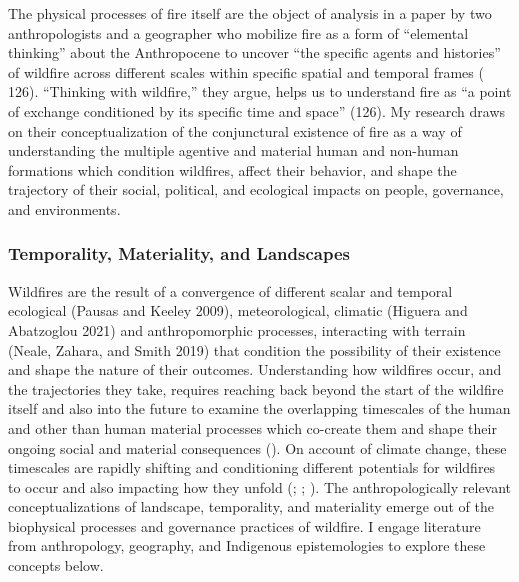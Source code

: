 \documentclass[
]{article}
\begin{document}
The physical processes of fire itself are the object of analysis in a paper by two anthropologists and a geographer who mobilize fire as a form of ``elemental thinking'' about the Anthropocene to uncover ``the specific agents and histories'' of wildfire across different scales within specific spatial and temporal frames ( 126). ``Thinking with wildfire,'' they argue, helps us to understand fire as ``a point of exchange conditioned by its specific time and space'' (126). My research draws on their conceptualization of the conjunctural existence of fire as a way of understanding the multiple agentive and material human and non-human formations which condition wildfires, affect their behavior, and shape the trajectory of their social, political, and ecological impacts on people, governance, and environments.

\subsubsection{Temporality, Materiality, and Landscapes}\label{temporality-materiality-and-landscapes}

Wildfires are the result of a convergence of different scalar and temporal ecological (Pausas and Keeley 2009), meteorological, climatic (Higuera and Abatzoglou 2021) and anthropomorphic processes, interacting with terrain (Neale, Zahara, and Smith 2019) that condition the possibility of their existence and shape the nature of their outcomes. Understanding how wildfires occur, and the trajectories they take, requires reaching back beyond the start of the wildfire itself and also into the future to examine the overlapping timescales of the human and other than human material processes which co-create them and shape their ongoing social and material consequences (). On account of climate change, these timescales are rapidly shifting and conditioning different potentials for wildfires to occur and also impacting how they unfold (; ; ). The anthropologically relevant conceptualizations of landscape, temporality, and materiality emerge out of the biophysical processes and governance practices of wildfire. I engage literature from anthropology, geography, and Indigenous epistemologies to explore these concepts below.
\end{document}
